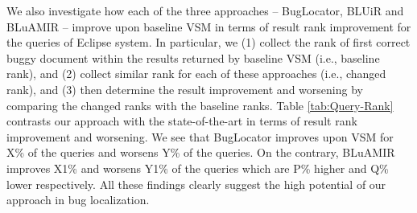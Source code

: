 \documentclass[conference]{IEEEtran}
\begin{document}
\begin{table}[!tb]
	\centering
	\caption{Impact of Weighting Parameter on BLuAMIR with SWT}
	\vspace{-.2cm}
	\label{tab:SWTalpha}
    \vspace{-.4cm}
	\centering
\end{table}

We also investigate how each of the three approaches -- BugLocator, BLUiR and BLuAMIR -- improve upon baseline VSM in terms of result rank improvement for the queries of Eclipse system. In particular, we (1) collect the rank of first correct buggy document within the results returned by baseline VSM (i.e., baseline rank), and (2) collect similar rank for each of these approaches (i.e., changed rank), and (3) then determine the result improvement and worsening by comparing the changed ranks with the baseline ranks. Table \ref{tab:Query-Rank} contrasts our approach with the state-of-the-art in terms of result rank improvement and worsening. We see that BugLocator improves upon VSM for X\% of the queries and worsens Y\% of the queries. On the contrary, BLuAMIR improves X1\% and worsens Y1\% of the queries which are P\% higher and Q\% lower respectively. All these findings clearly suggest the high potential of our approach in bug localization.    
\end{document}
